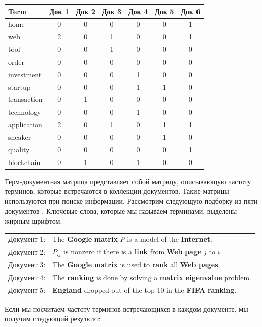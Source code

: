\begin{center}
 \begin{tabular}{ l | c c c c c c }
 Term        & Док 1 & Док 2 & Док 3 & Док 4 & Док 5 & Док 6 \\
 \hline
 home        & 0 & 0 & 0 & 0 & 0 & 1 \\
 web         & 2 & 0 & 1 & 0 & 0 & 1 \\
 tool        & 0 & 0 & 1 & 0 & 0 & 0 \\
 order       & 0 & 0 & 0 & 0 & 0 & 0 \\
 investment  & 0 & 0 & 0 & 1 & 0 & 0 \\
 startup     & 0 & 0 & 0 & 1 & 1 & 0 \\
 transaction & 0 & 1 & 0 & 0 & 0 & 0 \\
 technology  & 0 & 0 & 0 & 1 & 0 & 0 \\
 application & 2 & 0 & 1 & 0 & 1 & 1 \\
 sneaker     & 0 & 0 & 0 & 0 & 1 & 0 \\
 quality     & 0 & 0 & 0 & 0 & 0 & 1 \\
 blockchain  & 0 & 1 & 0 & 1 & 0 & 0 \\
\end{tabular}
\end{center}
\fi

Терм-документная матрица представляет собой матрицу, описывающую частоту терминов, которые встречаются в коллекции документов. Такие матрицы используются при поиске информации. Рассмотрим следующую подборку из пяти документов \cite{elden}. Ключевые слова, которые мы называем терминами,
выделены жирным шрифтом.

\begin{longtable}{ l p{12cm} }
 Документ 1: & The \textbf{Google} \textbf{matrix} $P$ is a model of the \textbf{Internet}. \\
 Документ 2: & $P_{ij}$ is nonzero if there is a \textbf{link} from \textbf{Web} \textbf{page} $j$ to $i$.\\
 Документ 3: & The \textbf{Google} \textbf{matrix} is used to \textbf{rank} all \textbf{Web} \textbf{pages}.\\
 Документ 4: & The \textbf{ranking} is done by solving a \textbf{matrix} \textbf{eigenvalue} problem.\\
 Документ 5: & \textbf{England} dropped out of the top 10 in the \textbf{FIFA} \textbf{ranking}.\\
\end{longtable}

Если мы посчитаем частоту терминов встречающихся в каждом документе, мы получим следующий результат:

